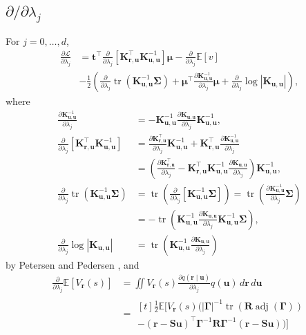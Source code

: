 \documentclass{mpaper}
\DeclareMathOperator{\adj}{adj}
\DeclareMathOperator{\tr}{tr}
\newcommand{\V}{V_{\mathbf{r}}}
\newcommand{\dx}{\,d\mathbf{r}\,d\mathbf{u}}
\newcommand{\Kuu}{\mathbf{K}_{\mathbf{u},\mathbf{u}}}
\newcommand{\Kru}{\mathbf{K}_{\mathbf{r},\mathbf{u}}}
\newcommand{\dlj}{\frac{\partial}{\partial \lambda_j}}
\begin{document}
\subsection{\texorpdfstring{$\partial/\partial \lambda_j$}{Derivative w.r.t.
    Lambda}}

For $j = 0, \dots, d$,
\[
  \begin{split}
    \frac{\partial \mathcal{L}}{\partial \lambda_j} &= \mathbf{t}^\intercal\dlj
    \left[ \Kru^\intercal\Kuu^{-1} \right] \bm\mu - \dlj\mathbb{E}[v] \\
    &- \frac{1}{2} \left(\dlj \tr \left(\Kuu^{-1}\bm\Sigma \right) +
      \bm\mu^\intercal \frac{\partial \Kuu^{-1}}{\partial \lambda_j} \bm\mu +
      \dlj \log |\Kuu| \right),
  \end{split}
\]
where
\begin{align*}
  \frac{\partial \Kuu^{-1}}{\partial \lambda_j} &= -\Kuu^{-1}\frac{\partial \Kuu}{\partial \lambda_j}\Kuu^{-1}, \\
  \dlj \left[ \Kru^\intercal\Kuu^{-1} \right] &= \frac{\partial \Kru^\intercal}{\partial \lambda_j} \Kuu^{-1} + \Kru^\intercal \frac{\partial \Kuu^{-1}}{\partial \lambda_j} \\
                                                &= \left( \frac{\partial \Kru^\intercal}{\partial \lambda_j} - \Kru^\intercal\Kuu^{-1}\frac{\partial \Kuu}{\partial \lambda_j} \right) \Kuu^{-1}, \\
  \dlj \tr(\Kuu^{-1}\bm\Sigma) &= \tr \left( \dlj \left[ \Kuu^{-1}\bm\Sigma \right] \right) = \tr \left( \frac{\partial \Kuu^{-1}}{\partial \lambda_j} \bm\Sigma \right) \\
                                                &= -\tr \left( \Kuu^{-1} \frac{\partial \Kuu}{\partial \lambda_j} \Kuu^{-1} \bm\Sigma \right), \\
  \dlj\log|\Kuu| &= \tr \left( \Kuu^{-1} \frac{\partial \Kuu}{\partial \lambda_j} \right)
\end{align*}
by Petersen and Pedersen \cite{petersen2008matrix}, and
\[
  \begin{split}
    \dlj \mathbb{E}[\V(s)] &= \iint\V(s)\frac{\partial q(\mathbf{r} \mid
      \mathbf{u})}{\partial \lambda_j}q(\mathbf{u})\dx \\
    &= \!\begin{multlined}[t]
      \frac{1}{2}\mathbb{E}[\V(s) (|\bm\Gamma|^{-1} \tr(\mathbf{R}
          \adj(\bm\Gamma)) \\
          - (\mathbf{r} -
          \mathbf{Su})^\intercal\bm\Gamma^{-1}\mathbf{R}\bm\Gamma^{-1}(\mathbf{r}
          - \mathbf{Su}))]
    \end{multlined}
  \end{split}
\]
\end{document}
